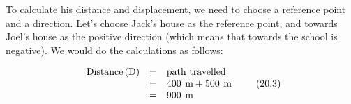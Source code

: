       \label{m38788*id62121}To calculate his distance and displacement, we need to choose a reference point and a direction. Let's choose Jack's house as the reference point, and towards Joel's house as the positive direction (which means that towards the school is negative). We would do the calculations as follows:\par 
      \label{m38788*id63444}\label{m38788*id63450}\nopagebreak\noindent{}
    \begin{equation}
    \begin{array}{ccc}\hfill \mathrm{Distance}\left(\mathrm{D}\right)& =& \mathrm{path}\phantom{\rule{3.33333pt}{0ex}}\mathrm{travelled}\hfill \\ & =& 400\phantom{\rule{4pt}{0ex}}\mathrm{m}+500\phantom{\rule{4pt}{0ex}}\mathrm{m}\hfill \\ & =& 900\phantom{\rule{4pt}{0ex}}\mathrm{m}\hfill \end{array}\tag{20.3}
      \end{equation}
        \label{m38788*id63551}\nopagebreak\noindent{}
          
